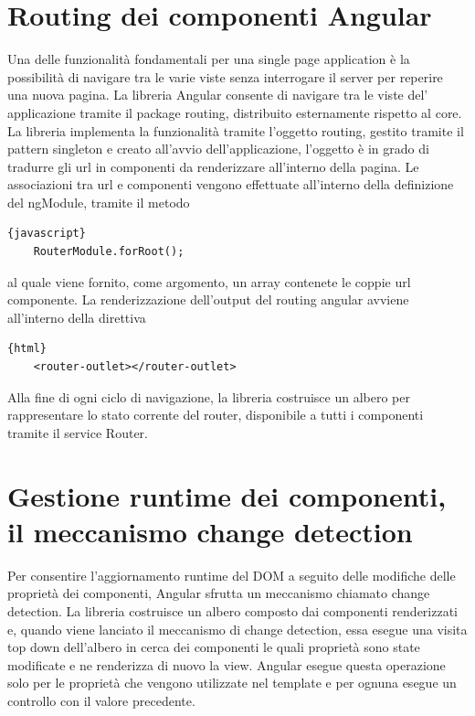 \section{Routing dei componenti Angular}
Una delle funzionalità fondamentali per una single page application è la possibilità di navigare tra le varie viste senza interrogare il server per reperire una nuova pagina.
La libreria Angular consente di navigare tra le viste del' applicazione tramite il package routing, distribuito esternamente rispetto al core.
\newline
\newline
La libreria implementa la funzionalità tramite l'oggetto routing, gestito tramite il pattern singleton e creato all'avvio dell'applicazione, l'oggetto è in grado di tradurre gli url in componenti da renderizzare all'interno della pagina.
Le associazioni tra url e componenti vengono effettuate all'interno della definizione del ngModule, tramite il metodo
\begin{lstlisting}{javascript}
    RouterModule.forRoot();
\end{lstlisting}
al quale viene fornito, come argomento, un array contenete le coppie url componente.
La renderizzazione dell'output del routing angular avviene all'interno della direttiva
\begin{lstlisting}{html}
    <router-outlet></router-outlet>
\end{lstlisting}
Alla fine di ogni ciclo di navigazione, la libreria costruisce un albero per rappresentare lo stato corrente del router, disponibile a tutti i componenti tramite il service Router.
\newpage\section{Gestione runtime dei componenti, il meccanismo change detection}
Per consentire l'aggiornamento runtime  del DOM a seguito delle modifiche delle proprietà dei componenti, Angular sfrutta un meccanismo chiamato change detection.
\newline
 La libreria costruisce un albero composto dai componenti renderizzati e, quando viene lanciato il meccanismo di change detection, essa esegue una visita top down dell'albero in cerca dei componenti le quali proprietà sono state modificate e ne renderizza di nuovo la view. Angular esegue questa operazione solo per le proprietà che vengono utilizzate nel template e per ognuna esegue un controllo con il valore precedente.
\newline
